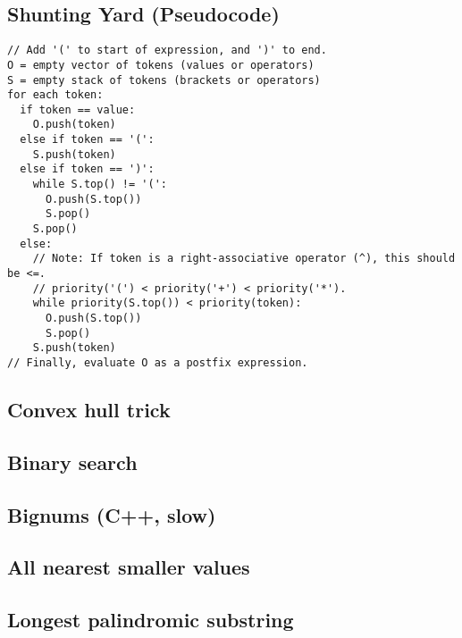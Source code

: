 \documentclass[9pt]{extarticle}
\begin{document}
\begin{multicols*}{3}
\subsection{Shunting Yard (Pseudocode)} %
\begin{lstlisting}
// Add '(' to start of expression, and ')' to end.
O = empty vector of tokens (values or operators)
S = empty stack of tokens (brackets or operators)
for each token:
  if token == value:
    O.push(token)
  else if token == '(':
    S.push(token)
  else if token == ')':
    while S.top() != '(':
      O.push(S.top())
      S.pop()
    S.pop()
  else:
    // Note: If token is a right-associative operator (^), this should be <=.
	// priority('(') < priority('+') < priority('*').
    while priority(S.top()) < priority(token):
      O.push(S.top())
      S.pop()
    S.push(token)
// Finally, evaluate O as a postfix expression.
\end{lstlisting}

\subsection{Convex hull trick} %


\subsection{Binary search} %


\subsection{Bignums (C++, slow)} %


\subsection{All nearest smaller values} %


\subsection{Longest palindromic substring} %

\end{multicols*}
\end{document}
